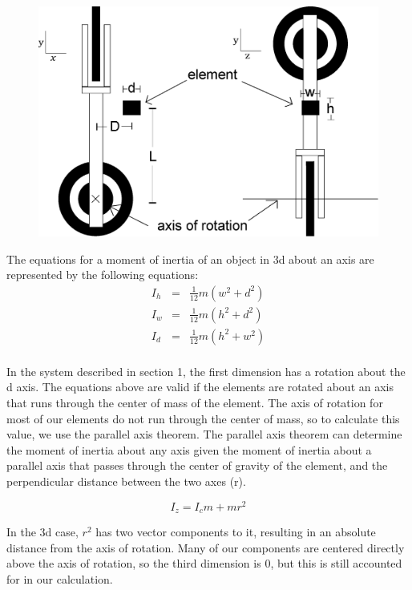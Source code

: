 \documentclass{article}
\begin{document}
\begin{figure}[h]
\centering
\includegraphics[scale=0.4]{momentOfInertiaDiagram}\\
\end{figure}

The equations for a moment of inertia of an object in 3d about an axis are represented by the following equations:
\begin{eqnarray}
I_{h} &=& \frac{1}{12} m(w^2 + d^2) \nonumber \\
I_{w} &=& \frac{1}{12} m(h^2 + d^2) \nonumber \\
I_{d} &=& \frac{1}{12} m(h^2 + w^2) \nonumber \\
\end{eqnarray}

In the system described in section 1, the first dimension has a rotation about the d axis.  The equations above are valid if the elements are rotated about an axis that runs through the center of mass of the element.  The axis of rotation for most of our elements do not run through the center of mass, so to calculate this value, we use the parallel axis theorem.  The parallel axis theorem can determine the moment of inertia about any axis given the moment of inertia about a parallel axis that passes through the center of gravity of the element, and the perpendicular distance between the two axes (r).  

\begin{equation}
I_{z} = I_cm + mr^2
\end{equation}


 
In the 3d case, $r^2$ has two vector components to it, resulting in an absolute distance from the axis of rotation.  Many of our components are centered directly above the axis of rotation, so the third dimension is 0, but this is still accounted for in our calculation.\\
\end{document}
